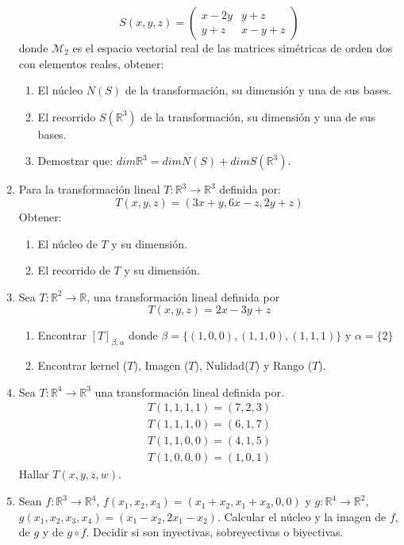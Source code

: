 \documentclass[12pt,letterpaper]{article}
\begin{document}
\begin{enumerate}
  $$
  S(x,y,z) = \begin{pmatrix}
    x-2y & y+z\\
    y+z & x-y+z
  \end{pmatrix}
  $$
  donde $\mathcal{M}_2$ es el espacio vectorial real de las matrices simétricas de orden dos con elementos reales, obtener:
  \begin{enumerate}
    \item El núcleo $N(S)$ de la transformación, su dimensión y una de sus bases.
    \item El recorrido $S(\mathbb{R}^3)$ de la transformación, su dimensión y una de sus bases.
    \item Demostrar que: $dim\mathbb{R}^3 = dim N(S) + dim S(\mathbb{R}^3)$.
  \end{enumerate}
  \item Para la transformación lineal $T : \mathbb{R}^3\to\mathbb{R}^3$ definida por:
  $$
  T (x, y, z) = (3x + y,6x- z,2y + z)
  $$
  Obtener:
  \begin{enumerate}
    \item El núcleo de $T$ y su dimensión.
    \item El recorrido de $T$ y su dimensión.
  \end{enumerate}
  \item Sea $T: \mathbb{R}^2\to\mathbb{R}$, una transformación lineal definida por
  $$
  T (x,y,z) = 2x -3y + z
  $$
  \begin{enumerate}
    \item Encontrar $[T]_{\beta,\alpha}$ donde $\beta = \{(1,0,0),(1,1,0),(1,1,1)\}$ y $\alpha =\{2\}$
    \item  Encontrar kernel ($T$), Imagen ($T$), Nulidad($T$) y Rango ($T$).
  \end{enumerate}
  \item Sea $T: \mathbb{R}^4\to\mathbb{R}^3$ una transformación lineal definida por.
  \begin{align*}
    T(1,1,1,1) = (7,2,3)\\
    T(1,1,1,0) =(6,1,7)\\
    T(1,1,0,0) = (4,1,5)\\
    T(1,0,0,0) = (1,0,1)
  \end{align*}
  Hallar $T( x,y,z,w)$.
  \item Sean $f : \mathbb{R}^3\to\mathbb{R}^4$, $f(x_1, x_2, x_3) = (x_1+x_2, x_1+x_3, 0, 0)$ y $g : \mathbb{R}^4\to\mathbb{R}^2$, $g(x_1, x_2, x_3, x_4) = (x_1 - x_2, 2x_1 - x_2)$. Calcular el núcleo y la imagen de $f$, de $g$ y de $g \circ  f$. Decidir si son inyectivas, sobreyectivas o biyectivas.

\end{enumerate}
\end{document}
